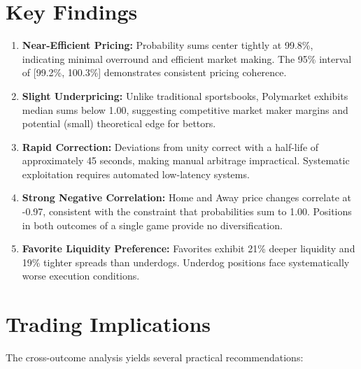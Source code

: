 \section{Key Findings}

\begin{keyfindings}
\begin{enumerate}
    \item \textbf{Near-Efficient Pricing:} Probability sums center tightly at 99.8\%, indicating minimal overround and efficient market making. The 95\% interval of [99.2\%, 100.3\%] demonstrates consistent pricing coherence.

    \item \textbf{Slight Underpricing:} Unlike traditional sportsbooks, Polymarket exhibits median sums below 1.00, suggesting competitive market maker margins and potential (small) theoretical edge for bettors.

    \item \textbf{Rapid Correction:} Deviations from unity correct with a half-life of approximately 45 seconds, making manual arbitrage impractical. Systematic exploitation requires automated low-latency systems.

    \item \textbf{Strong Negative Correlation:} Home and Away price changes correlate at -0.97, consistent with the constraint that probabilities sum to 1.00. Positions in both outcomes of a single game provide no diversification.

    \item \textbf{Favorite Liquidity Preference:} Favorites exhibit 21\% deeper liquidity and 19\% tighter spreads than underdogs. Underdog positions face systematically worse execution conditions.
\end{enumerate}
\end{keyfindings}

\section{Trading Implications}

The cross-outcome analysis yields several practical recommendations:

